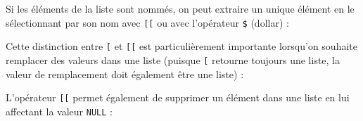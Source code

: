 \documentclass[
  french,
]{scrbook}
\newenvironment{Shaded}{\begin{snugshade}}{\end{snugshade}}
\newcommand{\CommentTok}[1]{\textcolor[rgb]{0.56,0.35,0.01}{\textit{#1}}}
\newcommand{\ConstantTok}[1]{\textcolor[rgb]{0.00,0.00,0.00}{#1}}
\newcommand{\DecValTok}[1]{\textcolor[rgb]{0.00,0.00,0.81}{#1}}
\newcommand{\FunctionTok}[1]{\textcolor[rgb]{0.00,0.00,0.00}{#1}}
\newcommand{\NormalTok}[1]{#1}
\newcommand{\OtherTok}[1]{\textcolor[rgb]{0.56,0.35,0.01}{#1}}
\newcommand{\SpecialCharTok}[1]{\textcolor[rgb]{0.00,0.00,0.00}{#1}}
\newcommand{\StringTok}[1]{\textcolor[rgb]{0.31,0.60,0.02}{#1}}
\begin{document}
Si les éléments de la liste sont nommés, on peut extraire un unique élément en le sélectionnant par son nom avec \texttt{{[}{[}} ou avec l'opérateur \texttt{\$} (dollar) :

\begin{Shaded}
\end{Shaded}

Cette distinction entre \texttt{{[}} et \texttt{{[}{[}} est particulièrement importante lorsqu'on souhaite remplacer des valeurs dans une liste (puisque \texttt{{[}} retourne toujours une liste, la valeur de remplacement doit également être une liste) :

\begin{Shaded}
\end{Shaded}

L'opérateur \texttt{{[}{[}} permet également de supprimer un élément dans une liste en lui affectant la valeur \texttt{NULL} :

\begin{Shaded}
\end{Shaded}
\end{document}
